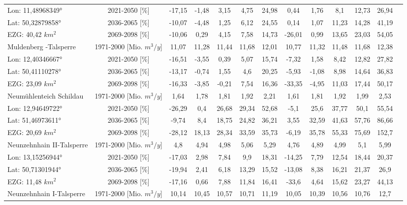 \begin{longtable}{@{\extracolsep{\fill}}lc|ccccc||cccccc}
\cline{2-13} 
Lon: 11,48968349° & 2021-2050 [\%]  & -17,15 & -1,48 & 3,15 & 4,75 & 24,98 & 0,44 & 1,76 & 8,1 & 12,73 & 26,94 & \\ 
Lat: 50,32879858° & 2036-2065 [\%]  & -10,07 & -4,48 & 1,25 & 6,12 & 24,55 & 0,14 & 1,07 & 11,23 & 14,28 & 41,19 & \\ 
EZG: 40,42 $km^2$ & 2069-2098 [\%]  & -10,06 & 0,29 & 4,15 & 7,58 & 14,73 & -26,01 & 0,99 & 13,65 & 23,03 & 54,05 & \\ 
\hline 
Muldenberg -Talsperre & 1971-2000 [Mio. $m^3/y$]  & 11,07 & 11,28 & 11,44 & 11,68 & 12,01 & 10,77 & 11,32 & 11,48 & 11,68 & 12,38 & \\ 
\cline{2-13} 
Lon: 12,40346667° & 2021-2050 [\%]  & -16,51 & -3,55 & 0,39 & 5,07 & 15,74 & -7,32 & 1,58 & 8,42 & 12,82 & 27,82 & \\ 
Lat: 50,41110278° & 2036-2065 [\%]  & -13,17 & -0,74 & 1,55 & 4,6 & 20,25 & -5,93 & -1,08 & 8,98 & 14,64 & 36,83 & \\ 
EZG: 23,09 $km^2$ & 2069-2098 [\%]  & -16,33 & -3,85 & -0,21 & 7,54 & 16,36 & -33,35 & -4,95 & 11,03 & 17,44 & 50,17 & \\ 
\hline 
Neumühlenteich Schildau & 1971-2000 [Mio. $m^3/y$]  & 1,64 & 1,78 & 1,81 & 1,92 & 2,21 & 1,61 & 1,81 & 1,92 & 1,99 & 2,53 & \\ 
\cline{2-13} 
Lon: 12,94649722° & 2021-2050 [\%]  & -26,29 & 0,4 & 26,68 & 29,34 & 52,68 & -5,1 & 25,6 & 37,77 & 50,1 & 55,54 & \\ 
Lat: 51,46973611° & 2036-2065 [\%]  & -9,74 & 8,4 & 18,75 & 24,82 & 36,21 & 3,55 & 32,59 & 41,63 & 57,76 & 86,66 & \\ 
EZG: 20,69 $km^2$ & 2069-2098 [\%]  & -28,12 & 18,13 & 28,34 & 33,59 & 35,73 & -6,19 & 35,78 & 55,33 & 75,69 & 152,7 & \\ 
\hline 
Neunzehnhain II-Talsperre & 1971-2000 [Mio. $m^3/y$]  & 4,8 & 4,94 & 4,98 & 5,06 & 5,29 & 4,76 & 4,89 & 4,99 & 5,1 & 5,99 & \\ 
\cline{2-13} 
Lon: 13,15256944° & 2021-2050 [\%]  & -17,03 & 2,98 & 7,84 & 9,9 & 18,31 & -14,25 & 7,79 & 12,54 & 18,44 & 20,37 & \\ 
Lat: 50,71301944° & 2036-2065 [\%]  & -19,94 & 2,41 & 6,18 & 13,29 & 15,52 & -13,08 & 8,38 & 16,21 & 21,37 & 26,9 & \\ 
EZG: 11,48 $km^2$ & 2069-2098 [\%]  & -17,16 & 0,66 & 7,88 & 11,84 & 16,41 & -33,6 & 4,64 & 15,62 & 23,27 & 44,13 & \\ 
\hline 
Neunzehnhain I-Talsperre & 1971-2000 [Mio. $m^3/y$]  & 10,14 & 10,45 & 10,57 & 10,71 & 11,19 & 10,05 & 10,39 & 10,56 & 10,76 & 12,7 & \\ 

\end{longtable}
